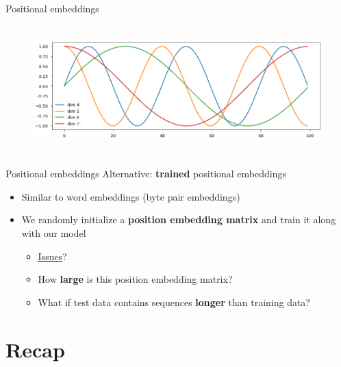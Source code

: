 \documentclass[12pt,aspectratio=169,handout]{beamer}
\begin{document}
\begin{frame}{Positional embeddings}
	\begin{center}
		\begin{figure}[h]
			\includegraphics[height=5cm]{positional_embs}
		\end{figure}
		\end{center}
\end{frame}


\begin{frame}{Positional embeddings}
	Alternative: \textbf{trained} positional embeddings

	\pause
	\begin{itemize}
		\item Similar to word embeddings (byte pair embeddings)
		\item We randomly initialize a \textbf{position embedding matrix} and train it along with our model
		\pause
		\begin{itemize}
			\item \underline{Issues}?
			\pause
			\item How \textbf{large} is this position embedding matrix?
			\item What if test data contains sequences \textbf{longer} than training data? 
		\end{itemize}
	\end{itemize}

\end{frame}


\section*{Recap}

%
%
%
%
\end{document}
